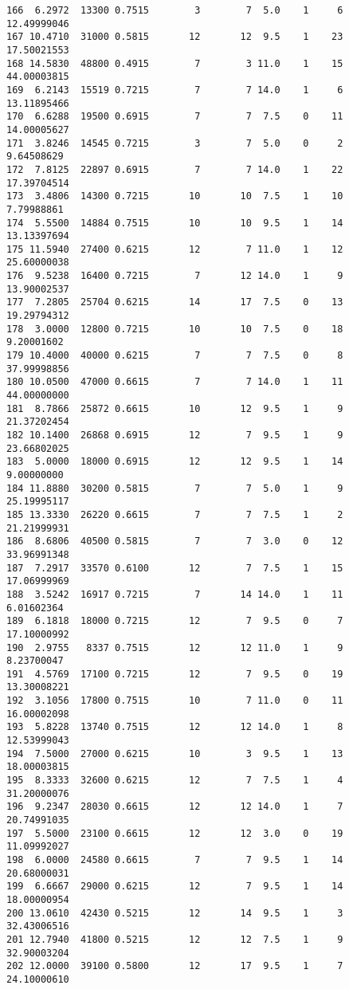 \documentclass[
  letterpaper,
  DIV=11,
  numbers=noendperiod]{scrreprt}
\begin{document}
\begin{verbatim}
166  6.2972  13300 0.7515        3        7  5.0    1     6 12.49999046
167 10.4710  31000 0.5815       12       12  9.5    1    23 17.50021553
168 14.5830  48800 0.4915        7        3 11.0    1    15 44.00003815
169  6.2143  15519 0.7215        7        7 14.0    1     6 13.11895466
170  6.6288  19500 0.6915        7        7  7.5    0    11 14.00005627
171  3.8246  14545 0.7215        3        7  5.0    0     2  9.64508629
172  7.8125  22897 0.6915        7        7 14.0    1    22 17.39704514
173  3.4806  14300 0.7215       10       10  7.5    1    10  7.79988861
174  5.5500  14884 0.7515       10       10  9.5    1    14 13.13397694
175 11.5940  27400 0.6215       12        7 11.0    1    12 25.60000038
176  9.5238  16400 0.7215        7       12 14.0    1     9 13.90002537
177  7.2805  25704 0.6215       14       17  7.5    0    13 19.29794312
178  3.0000  12800 0.7215       10       10  7.5    0    18  9.20001602
179 10.4000  40000 0.6215        7        7  7.5    0     8 37.99998856
180 10.0500  47000 0.6615        7        7 14.0    1    11 44.00000000
181  8.7866  25872 0.6615       10       12  9.5    1     9 21.37202454
182 10.1400  26868 0.6915       12        7  9.5    1     9 23.66802025
183  5.0000  18000 0.6915       12       12  9.5    1    14  9.00000000
184 11.8880  30200 0.5815        7        7  5.0    1     9 25.19995117
185 13.3330  26220 0.6615        7        7  7.5    1     2 21.21999931
186  8.6806  40500 0.5815        7        7  3.0    0    12 33.96991348
187  7.2917  33570 0.6100       12        7  7.5    1    15 17.06999969
188  3.5242  16917 0.7215        7       14 14.0    1    11  6.01602364
189  6.1818  18000 0.7215       12        7  9.5    0     7 17.10000992
190  2.9755   8337 0.7515       12       12 11.0    1     9  8.23700047
191  4.5769  17100 0.7215       12        7  9.5    0    19 13.30008221
192  3.1056  17800 0.7515       10        7 11.0    0    11 16.00002098
193  5.8228  13740 0.7515       12       12 14.0    1     8 12.53999043
194  7.5000  27000 0.6215       10        3  9.5    1    13 18.00003815
195  8.3333  32600 0.6215       12        7  7.5    1     4 31.20000076
196  9.2347  28030 0.6615       12       12 14.0    1     7 20.74991035
197  5.5000  23100 0.6615       12       12  3.0    0    19 11.09992027
198  6.0000  24580 0.6615        7        7  9.5    1    14 20.68000031
199  6.6667  29000 0.6215       12        7  9.5    1    14 18.00000954
200 13.0610  42430 0.5215       12       14  9.5    1     3 32.43006516
201 12.7940  41800 0.5215       12       12  7.5    1     9 32.90003204
202 12.0000  39100 0.5800       12       17  9.5    1     7 24.10000610

\end{verbatim}
\end{document}
